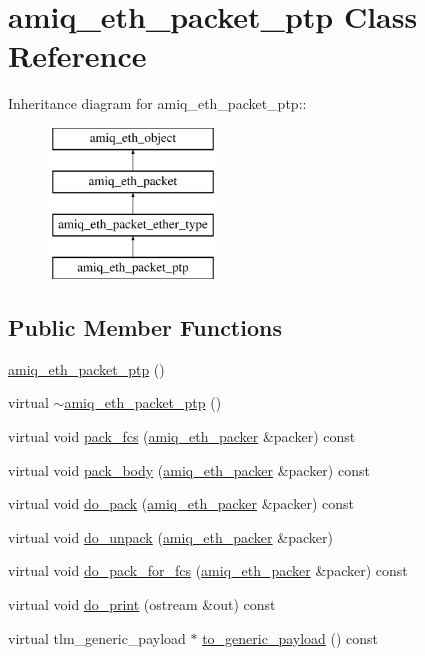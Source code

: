 \hypertarget{classamiq__eth__packet__ptp}{
\section{amiq\_\-eth\_\-packet\_\-ptp Class Reference}
\label{classamiq__eth__packet__ptp}
}
Inheritance diagram for amiq\_\-eth\_\-packet\_\-ptp::\begin{figure}[H]
\begin{center}
\leavevmode
\includegraphics[height=4cm]{classamiq__eth__packet__ptp}
\end{center}
\end{figure}
\subsection*{Public Member Functions}
\begin{DoxyCompactItemize}
\item 
\hyperlink{classamiq__eth__packet__ptp_a20167ddce08cead24360e27ac9e1e570}{amiq\_\-eth\_\-packet\_\-ptp} ()
\item 
virtual \hyperlink{classamiq__eth__packet__ptp_a3970961ac5aec4bb174e10bc463117bb}{$\sim$amiq\_\-eth\_\-packet\_\-ptp} ()
\item 
virtual void \hyperlink{classamiq__eth__packet__ptp_ab7bc36daf8f06a4c65e4cbe4c84a04a7}{pack\_\-fcs} (\hyperlink{classamiq__eth__packer}{amiq\_\-eth\_\-packer} \&packer) const 
\item 
virtual void \hyperlink{classamiq__eth__packet__ptp_aa9c14abac259c28ca17c69eecaa5a403}{pack\_\-body} (\hyperlink{classamiq__eth__packer}{amiq\_\-eth\_\-packer} \&packer) const 
\item 
virtual void \hyperlink{classamiq__eth__packet__ptp_a5d415af5fcb6ed2cb603aaf0105fdd43}{do\_\-pack} (\hyperlink{classamiq__eth__packer}{amiq\_\-eth\_\-packer} \&packer) const 
\item 
virtual void \hyperlink{classamiq__eth__packet__ptp_a831addd66dff7e42f2e2e9edb6f976b3}{do\_\-unpack} (\hyperlink{classamiq__eth__packer}{amiq\_\-eth\_\-packer} \&packer)
\item 
virtual void \hyperlink{classamiq__eth__packet__ptp_a68337ad7c7971f267b692dfbd92ede7b}{do\_\-pack\_\-for\_\-fcs} (\hyperlink{classamiq__eth__packer}{amiq\_\-eth\_\-packer} \&packer) const 
\item 
virtual void \hyperlink{classamiq__eth__packet__ptp_a52db9ab62ab743317a7ca4745a823a82}{do\_\-print} (ostream \&out) const 
\item 
virtual tlm\_\-generic\_\-payload $\ast$ \hyperlink{classamiq__eth__packet__ptp_a7c1a6b1207ce7e9e604e05cd883bccc0}{to\_\-generic\_\-payload} () const 
\end{DoxyCompactItemize}

